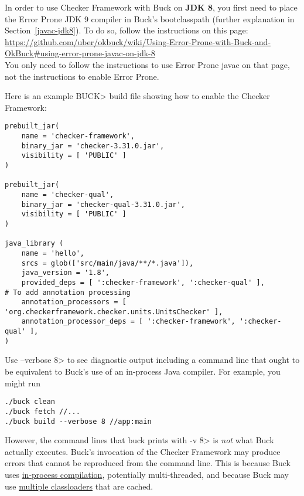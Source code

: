 In order to use Checker Framework with Buck on \textbf{JDK 8}, you first need
to place the Error Prone JDK 9 compiler in Buck's bootclasspath
(further explanation in Section~\ref{javac-jdk8}).  To do so,
follow the instructions on this page: \\
{\codesize\url{https://github.com/uber/okbuck/wiki/Using-Error-Prone-with-Buck-and-OkBuck#using-error-prone-javac-on-jdk-8}} \\
You only need to follow the instructions to use Error Prone javac on
that page, not the instructions to enable Error Prone.

Here is an example \<BUCK> build
file showing how to enable the Checker Framework:

\begin{Verbatim}
prebuilt_jar(
    name = 'checker-framework',
    binary_jar = 'checker-3.31.0.jar',
    visibility = [ 'PUBLIC' ]
)

prebuilt_jar(
    name = 'checker-qual',
    binary_jar = 'checker-qual-3.31.0.jar',
    visibility = [ 'PUBLIC' ]
)

java_library (
    name = 'hello',
    srcs = glob(['src/main/java/**/*.java']),
    java_version = '1.8',
    provided_deps = [ ':checker-framework', ':checker-qual' ],
# To add annotation processing
    annotation_processors = [ 'org.checkerframework.checker.units.UnitsChecker' ],
    annotation_processor_deps = [ ':checker-framework', ':checker-qual' ],
)
\end{Verbatim}



Use \<--verbose 8> to see diagnostic output including a command line that
ought to be equivalent to Buck's use of an in-process Java compiler.
For example, you might run

\begin{Verbatim}
./buck clean
./buck fetch //...
./buck build --verbose 8 //app:main
\end{Verbatim}

However, the command lines that buck prints with \<-v 8> is \emph{not} what
Buck actually executes.  Buck's invocation of the Checker Framework may
produce errors that cannot be reproduced from the command line.  This is
because Buck uses
\href{https://github.com/facebook/buck/blob/main/src/com/facebook/buck/jvm/java/Jsr199Javac.java}{in-process
  compilation}, potentially multi-threaded, and because Buck may use
\href{https://github.com/facebook/buck/blob/main/src/com/facebook/buck/util/ClassLoaderCache.java}{multiple
  classloaders} that are cached.

